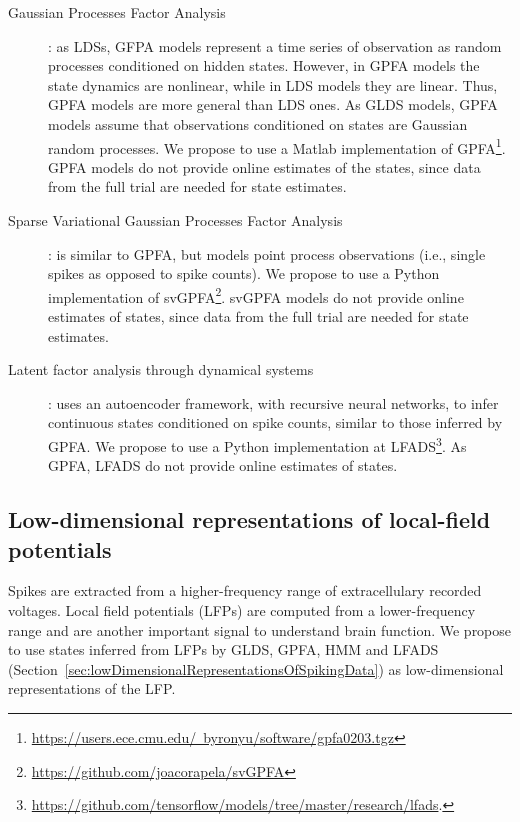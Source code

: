 \documentclass[a4paper,11point]{article}
\begin{document}
\begin{description}
    \item[Gaussian Processes Factor Analysis]\citep[GPFA;][]{yuEtAl09}: as
        LDSs, GFPA models represent a time series of observation as random
        processes conditioned on hidden states. However, in GPFA models the
        state dynamics are nonlinear, while in LDS models they are linear.
        Thus, GPFA models are more general than LDS ones. As GLDS models, GPFA
        models assume that observations conditioned on states are Gaussian
        random processes. We propose to use a Matlab implementation of
        GPFA\footnote{\href{https://users.ece.cmu.edu/~byronyu/software/gpfa0203.tgz}{https://users.ece.cmu.edu/~byronyu/software/gpfa0203.tgz}}.
        GPFA models do not provide online estimates of the states, since data
        from the full trial are needed for state estimates.

    \item[Sparse Variational Gaussian Processes Factor
        Analysis]\citep[svGPFA;][]{dunckerAndSahani18}: is similar to GPFA, but
        models point process observations (i.e., single spikes as opposed to
        spike counts). We propose to use a Python implementation of
        svGPFA\footnote{\href{https://github.com/joacorapela/svGPFA}{https://github.com/joacorapela/svGPFA}}.
        svGPFA models do not provide online estimates of states, since data
        from the full trial are needed for state estimates.

    \item[Latent factor analysis through dynamical
        systems]\citep[LFADS;][]{pandarinathEtAl18}: uses an autoencoder
        framework, with recursive neural networks, to infer continuous states
        conditioned on spike counts, similar to those inferred by GPFA. We
        propose to use a Python implementation at
        LFADS\footnote{\href{https://github.com/tensorflow/models/tree/master/research/lfads}{https://github.com/tensorflow/models/tree/master/research/lfads}.}.
        As GPFA, LFADS do not provide online estimates of states.

\end{description}

\subsection{Low-dimensional representations of local-field potentials}
\label{sec:lowDimensionalRepresentationsOfLFPs}

Spikes are extracted from a higher-frequency range of extracellulary recorded
voltages. Local field potentials (LFPs) are computed from a lower-frequency
range and are another important signal to understand brain function. We propose
to use states inferred from LFPs by GLDS, GPFA, HMM and LFADS
(Section~\ref{sec:lowDimensionalRepresentationsOfSpikingData}) as
low-dimensional representations of the LFP.
\end{document}
